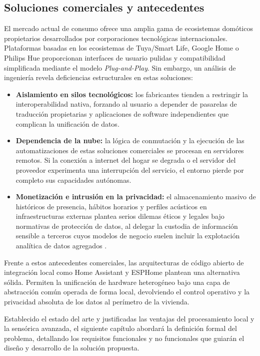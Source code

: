 \subsection{Soluciones comerciales y antecedentes}
El mercado actual de consumo ofrece una amplia gama de ecosistemas domóticos propietarios desarrollados por corporaciones tecnológicas internacionales. Plataformas basadas en los ecosistemas de Tuya/Smart Life, Google Home o Philips Hue proporcionan interfaces de usuario pulidas y compatibilidad simplificada mediante el modelo \textit{Plug-and-Play}. Sin embargo, un análisis de ingeniería revela deficiencias estructurales en estas soluciones:

\begin{itemize}
    \item \textbf{Aislamiento en silos tecnológicos:} los fabricantes tienden a restringir la interoperabilidad nativa, forzando al usuario a depender de pasarelas de traducción propietarias y aplicaciones de software independientes que complican la unificación de datos.
    \item \textbf{Dependencia de la nube:} la lógica de conmutación y la ejecución de las automatizaciones de estas soluciones comerciales se procesan en servidores remotos. Si la conexión a internet del hogar se degrada o el servidor del proveedor experimenta una interrupción del servicio, el entorno pierde por completo sus capacidades autónomas.
    \item \textbf{Monetización e intrusión en la privacidad:} el almacenamiento masivo de históricos de presencia, hábitos horarios y perfiles acústicos en infraestructuras externas plantea serios dilemas éticos y legales bajo normativas de protección de datos, al delegar la custodia de información sensible a terceros cuyos modelos de negocio suelen incluir la explotación analítica de datos agregados \cite{perera2014context}.
\end{itemize}

Frente a estos antecedentes comerciales, las arquitecturas de código abierto de integración local como Home Assistant y ESPHome plantean una alternativa sólida. Permiten la unificación de hardware heterogéneo bajo una capa de abstracción común operada de forma local, devolviendo el control operativo y la privacidad absoluta de los datos al perímetro de la vivienda.

Establecido el estado del arte y justificadas las ventajas del procesamiento local y la sensórica avanzada, el siguiente capítulo abordará la definición formal del problema, detallando los requisitos funcionales y no funcionales que guiarán el diseño y desarrollo de la solución propuesta.